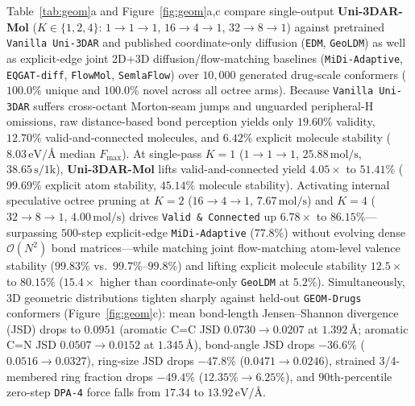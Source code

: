 \documentclass[11pt,a4paper]{article}
\begin{document}
Table~\ref{tab:geom}a and Figure~\ref{fig:geom}a,c compare single-output \textbf{Uni-3DAR-Mol} ($K \in \{1, 2, 4\}$: $1\to 1\to 1$, $16\to 4\to 1$, $32\to 8\to 1$) against pretrained \texttt{Vanilla Uni-3DAR} and published coordinate-only diffusion (\texttt{EDM}, \texttt{GeoLDM}) as well as explicit-edge joint 2D+3D diffusion/flow-matching baselines (\texttt{MiDi-Adaptive}, \texttt{EQGAT-diff}, \texttt{FlowMol}, \texttt{SemlaFlow}) over $10{,}000$ generated drug-scale conformers ($100.0\%$ unique and $100.0\%$ novel across all octree arms). Because \texttt{Vanilla Uni-3DAR} suffers cross-octant Morton-seam jumps and unguarded peripheral-H omissions, raw distance-based bond perception yields only $19.60\%$ validity, $12.70\%$ valid-and-connected molecules, and $6.42\%$ explicit molecule stability ($8.03\,\text{eV/\AA}$ median $F_{\max}$). At single-pass $K=1$ ($1\to 1\to 1$, $25.88\,\text{mol/s}$, $38.65\,\text{s/1k}$), \textbf{Uni-3DAR-Mol} lifts valid-and-connected yield $4.05\times$ to $51.41\%$ ($99.69\%$ explicit atom stability, $45.14\%$ molecule stability). Activating internal speculative octree pruning at $K=2$ ($16\to 4\to 1$, $7.67\,\text{mol/s}$) and $K=4$ ($32\to 8\to 1$, $4.00\,\text{mol/s}$) drives \texttt{Valid \& Connected} up $\mathbf{6.78\times}$ to $\mathbf{86.15\%}$---surpassing $500$-step explicit-edge \texttt{MiDi-Adaptive} ($77.8\%$) without evolving dense $\mathcal{O}(N^2)$ bond matrices---while matching joint flow-matching atom-level valence stability ($\mathbf{99.83\%}$ vs.\ $99.7\%\text{--}99.8\%$) and lifting explicit molecule stability $\mathbf{12.5\times}$ to $\mathbf{80.15\%}$ ($15.4\times$ higher than coordinate-only \texttt{GeoLDM} at $5.2\%$). Simultaneously, 3D geometric distributions tighten sharply against held-out \texttt{GEOM-Drugs} conformers (Figure~\ref{fig:geom}c): mean bond-length Jensen--Shannon divergence (JSD) drops to $0.0951$ (aromatic $\text{C=C}$ JSD $0.0730 \to \mathbf{0.0207}$ at $1.392\,\text{\AA}$; aromatic $\text{C=N}$ JSD $0.0507 \to \mathbf{0.0152}$ at $1.345\,\text{\AA}$), bond-angle JSD drops $-36.6\%$ ($0.0516 \to 0.0327$), ring-size JSD drops $-47.8\%$ ($0.0471 \to 0.0246$), strained 3/4-membered ring fraction drops $-49.4\%$ ($12.35\% \to 6.25\%$), and $90$th-percentile zero-step \texttt{DPA-4} force falls from $17.34$ to $13.92\,\text{eV/\AA}$.
\end{document}
